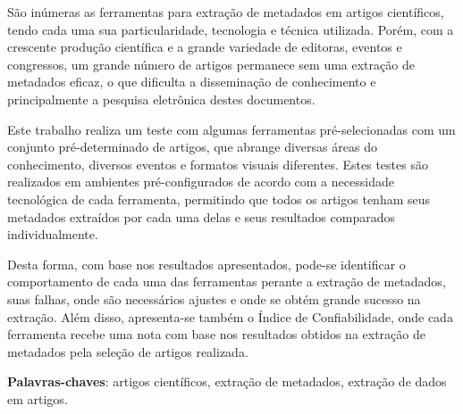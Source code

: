 
\setlength{\absparsep}{18pt} %
\begin{resumo}


São inúmeras as ferramentas para extração de metadados em artigos científicos, tendo cada uma sua particularidade, tecnologia e técnica utilizada. Porém, com a crescente produção científica e a grande variedade de editoras, eventos e congressos, um grande número de artigos permanece sem uma extração de metadados eficaz, o que dificulta a disseminação de conhecimento e principalmente a pesquisa eletrônica destes documentos.

Este trabalho realiza um teste com algumas ferramentas pré-selecionadas com um conjunto pré-determinado de artigos, que abrange diversas áreas do conhecimento, diversos eventos e formatos visuais diferentes. Estes testes são realizados em ambientes pré-configurados de acordo com a necessidade tecnológica de cada ferramenta, permitindo que todos os artigos tenham seus metadados extraídos por cada uma delas e seus resultados comparados individualmente. 

Desta forma, com base nos resultados apresentados, pode-se identificar o comportamento de cada uma das ferramentas perante a extração de metadados, suas falhas, onde são necessários ajustes e onde se obtém grande sucesso na extração. Além disso, apresenta-se também o Índice de Confiabilidade, onde cada ferramenta recebe uma nota com base nos resultados obtidos na extração de metadados pela seleção de artigos realizada.

\textbf{Palavras-chaves}: artigos científicos, extração de metadados, extração de dados em artigos.

\end{resumo}

